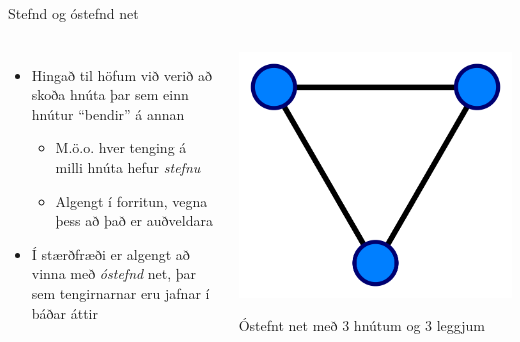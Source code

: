 \documentclass{beamer}
\begin{document}
\begin{frame}{Stefnd og óstefnd net}
\begin{columns}
\begin{itemize}
 \item Hingað til höfum við verið að skoða hnúta þar sem einn hnútur ``bendir'' á annan
 \begin{itemize}
  \item M.ö.o. hver tenging á milli hnúta hefur \emph{stefnu}
  \item Algengt í forritun, vegna þess að það er auðveldara
 \end{itemize}
 \item Í stærðfræði er algengt að vinna með \emph{óstefnd} net, þar sem tengirnarnar eru jafnar í báðar áttir
\end{itemize}
\begin{center}
\includegraphics[width=\linewidth]{Pics/undirected}

Óstefnt net með 3 hnútum og 3 leggjum 
\end{center}
\end{columns}
\end{frame}
\end{document}

